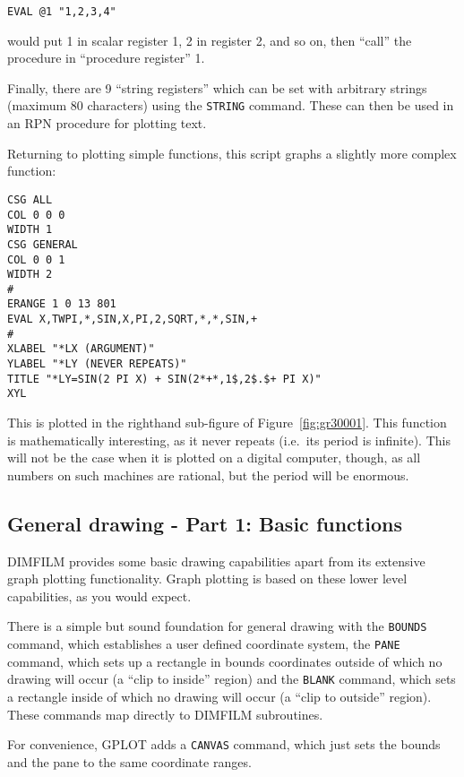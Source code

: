 \documentclass[a4paper,twoside,11pt]{article}
\newcommand{\newpara}{\par\vspace{4mm}\noindent}
\begin{document}
\begin{lstlisting}
EVAL @1 "1,2,3,4"
\end{lstlisting}

\newpara
would put 1 in scalar register 1, 2 in register 2, and so on, then
``call'' the procedure in ``procedure register'' 1.

\newpara
Finally, there are 9 ``string registers'' which can be set with
arbitrary strings (maximum 80 characters) using the \texttt{STRING}
command. These can then be used in an RPN procedure for plotting text.

\newpara
Returning to plotting simple functions, this script graphs a slightly
more complex function:

\begin{lstlisting}
CSG ALL
COL 0 0 0
WIDTH 1
CSG GENERAL
COL 0 0 1
WIDTH 2
#
ERANGE 1 0 13 801
EVAL X,TWPI,*,SIN,X,PI,2,SQRT,*,*,SIN,+
#
XLABEL "*LX (ARGUMENT)"
YLABEL "*LY (NEVER REPEATS)"
TITLE "*LY=SIN(2 PI X) + SIN(2*+*,1$,2$.$+ PI X)"
XYL
\end{lstlisting}

\newpara
This is plotted in the righthand sub-figure of Figure~\ref{fig:gr30001}.
This function is
mathematically interesting, as it never repeats (i.e.~its period is
infinite). This will not be the case when it is plotted on a digital
computer, though, as all numbers on such machines are rational, but the
period will be enormous.


\subsection{General drawing - Part 1: Basic functions}\label{general-drawing---part-1-basic-functions}

\newpara
DIMFILM provides some basic drawing capabilities apart from its
extensive graph plotting functionality. Graph plotting is based on these
lower level capabilities, as you would expect.

\newpara
There is a simple but sound foundation for general drawing with the
\texttt{BOUNDS} command, which establishes a user defined coordinate
system, the \texttt{PANE} command, which sets up a rectangle in bounds
coordinates outside of which no drawing will occur (a ``clip to inside''
region) and the \texttt{BLANK} command, which sets a rectangle inside of
which no drawing will occur (a ``clip to outside'' region). These
commands map directly to DIMFILM subroutines.

\newpara
For convenience, GPLOT adds a \texttt{CANVAS} command, which just sets
the bounds and the pane to the same coordinate ranges.
\end{document}

